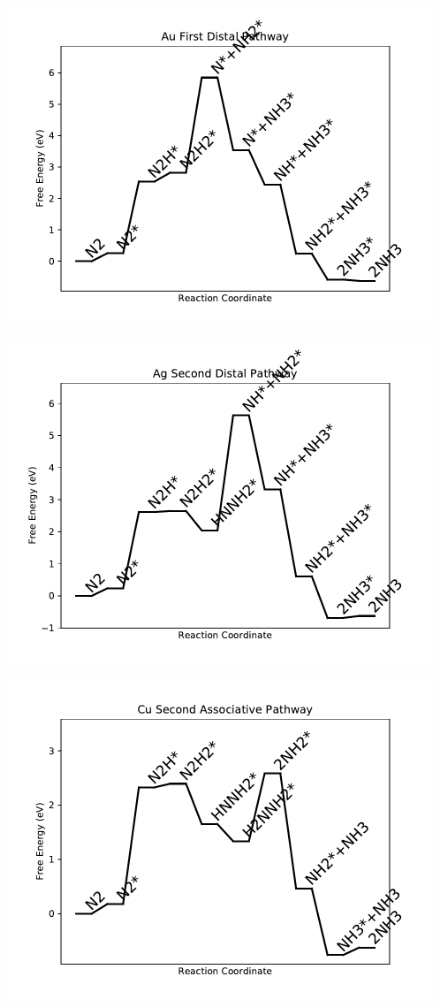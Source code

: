 \begin{figure}
\includegraphics[width=0.8\linewidth]{data/plots/Au_distal_1.pdf}
\label{fig:Au_distal_1}
\end{figure}

\begin{figure}
\includegraphics[width=0.8\linewidth]{data/plots/Ag_distal_2.pdf}
\label{fig:Ag_distal_2}
\end{figure}

\begin{figure}
\includegraphics[width=0.8\linewidth]{data/plots/Cu_associative_2.pdf}
\label{fig:Cu_associative_2}
\end{figure}

